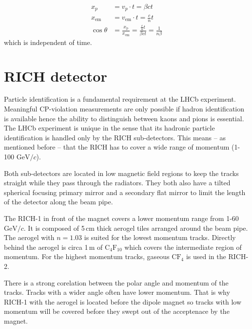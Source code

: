 \documentclass[11pt,twoside]{scrreprt}
\begin{document}
\begin{align}
    x_p &= v_{p}\cdot t = \beta c t \nonumber \\
    x_{\text{em}} &= v_{\text{em}}\cdot t=\frac{c}{n}t \nonumber \\
    \cos\theta &= \frac{x_{\text{p}}}{x_{\text{em}}} = \frac{\frac{c}{n}t}{\beta c t} = \frac{1}{n\beta} \nonumber
\end{align}
which is independent of time.

\section{RICH detector} %
\label{sec:rich_detector}

Particle identification is a fundamental requirement at the LHCb experiment. Meaningful CP-violation measurements are only possible if hadron identification is available hence the ability to distinguish between kaons and pions is  essential.
The LHCb experiment is unique in the sense that its hadronic particle identification is handled only by the RICH sub-detectors. This means -- as mentioned before -- that the RICH has to cover a wide range of momentum (1-100 $\text{GeV}/c$).

Both sub-detectors are located in low magnetic field regions to keep the tracks straight while they pass through the radiators. They both 
also have a tilted spherical focusing primary mirror and a secondary flat mirror to limit the length of the detector along the beam pipe.

The RICH-1 in front of the magnet covers a lower momentum range from 1-60 $\text{GeV}/c$. It is composed of 5\,cm thick aerogel tiles arranged around the beam pipe. The aerogel with $n=1.03$ is suited for the lowest momentum tracks. Directly behind the aerogel is circa 1\,m of $\text{C}_4\text{F}_{10}$ which covers the intermediate region of momentum.
For the highest momentum tracks, gaseous $\text{C}\text{F}_4$ is used in the RICH-2.

There is a strong corelation between the polar angle and momentum of the tracks. Tracks with a wider angle often have lower momentum. That is why RICH-1 with the aerogel is located before the dipole magnet so tracks with low momentum will be covered before they swept out of the acceptenace by the magnet.
\end{document}
